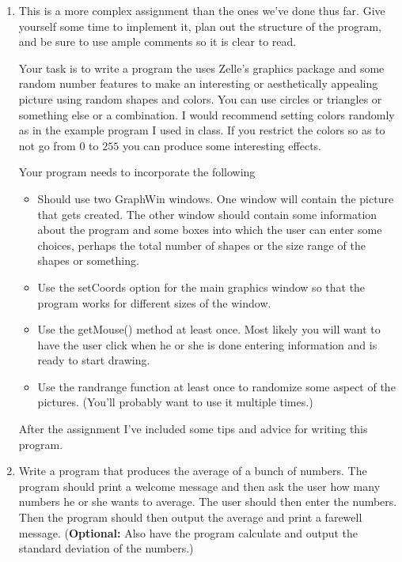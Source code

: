 \documentclass[12pt]{article}
\begin{document}
\begin{enumerate}

\item This is a more complex assignment than the ones we've done thus
  far.  Give yourself some time to implement it, plan out the
  structure of the program, and be sure to use ample comments so it is
  clear to read.

  Your task is to write a program the uses Zelle's graphics package
  and some random number features to make an interesting or
  aesthetically appealing picture using random shapes and colors.  You
  can use circles or triangles or something else or a combination.
  I would recommend setting colors randomly as in the example program
  I used in class.  If you restrict the colors so as to not go from
  $0$ to $255$ you can produce some interesting effects.

  Your program needs to incorporate the following
\begin{itemize}
    \item Should use two GraphWin windows.  One window will contain
      the picture that gets created.  The other window should contain
      some information about the program and some boxes into which the
      user can enter some choices, perhaps the total number of shapes
      or the size range of the shapes or something.

    \item Use the setCoords option for the main graphics window so
      that the program works for different sizes of the window.

    \item Use the getMouse() method at least once.  Most likely you
      will want to have the user click when he or she is done entering
      information and is ready to start drawing.

    \item Use the randrange function at least once to randomize some
      aspect of the pictures.  (You'll probably want to use it
      multiple times.)
\end{itemize}
After the assignment I've included some tips and advice for writing
this program. \\


\item Write a program that produces the average of a bunch of numbers.
  The program should print a welcome message and then ask the user how
  many numbers he or she wants to average.  The user should then enter
  the numbers.  Then the program should then output the average and
  print a farewell message.  ({\bf Optional:} Also have the program
  calculate and output the standard deviation of the numbers.) 



\end{enumerate}
\end{document}
